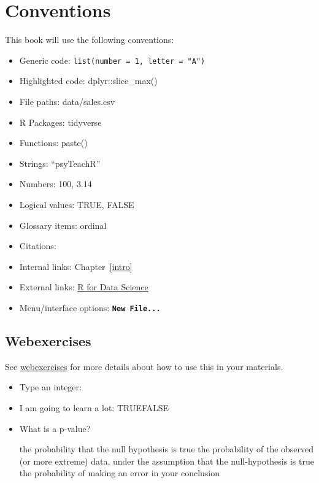 \documentclass[
  oneside]{book}
\providecommand{\tightlist}{%
  \setlength{\itemsep}{0pt}\setlength{\parskip}{0pt}}
\begin{document}
\hypertarget{conventions}{%
\chapter{Conventions}\label{conventions}}

This book will use the following conventions:

\begin{itemize}
\tightlist
\item
  Generic code: \texttt{list(number\ =\ 1,\ letter\ =\ "A")}
\item
  Highlighted code: {dplyr}{::}{slice\_max}{(}{)}
\item
  File paths: data/sales.csv
\item
  R Packages: tidyverse
\item
  Functions: {paste}{(}{)}
\item
  Strings: {``psyTeachR''}
\item
  Numbers: {100}, {3.14}
\item
  Logical values: {TRUE}, {FALSE}
\item
  Glossary items: ordinal
\item
  Citations: \citet{R-tidyverse}
\item
  Internal links: Chapter~\ref{intro}
\item
  External links: \href{https://r4ds.had.co.nz/}{R for Data Science}
\item
  Menu/interface options: \textbf{\texttt{New\ File...}}
\end{itemize}

\hypertarget{webexercises}{%
\section{Webexercises}\label{webexercises}}

See \href{https://psyteachr.github.io/webexercises/}{webexercises} for more details about how to use this in your materials.

\begin{itemize}
\tightlist
\item
  Type an integer:
\item
  I am going to learn a lot: TRUEFALSE
\item
  What is a p-value?

  \hypertarget{radio_WCXBRTQDFT}{}
  {the probability that the null hypothesis is true} {the probability of the observed (or more extreme) data, under the assumption that the null-hypothesis is true} {the probability of making an error in your conclusion}
\end{itemize}
\end{document}

